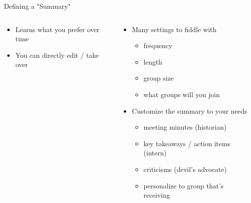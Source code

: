 \documentclass[aspectratio=169]{beamer}
\begin{document}
\begin{frame}{Defining a "Summary"}
\begin{columns}[T]
    \begin{column}[T]{0.5\textwidth}
        \begin{itemize}
            \item Learns what you prefer over time
            \item You can directly edit / take over
        \end{itemize}
    \end{column}
    \begin{column}[T]{0.5\textwidth}
        \begin{itemize}
            \item Many settings to fiddle with
            \begin{itemize}
                \item frequency
                \item length
                \item group size
                \item what groups will you join
            \end{itemize}
            \item Customize the summary to your needs
            \begin{itemize}
                \item meeting minutes (historian)
                \item key takeaways / action items (intern)
                \item criticisms (devil's advocate)
                \item personalize to group that's receiving
            \end{itemize}
        \end{itemize}
    \end{column}
\end{columns}
\end{frame}
\end{document}
